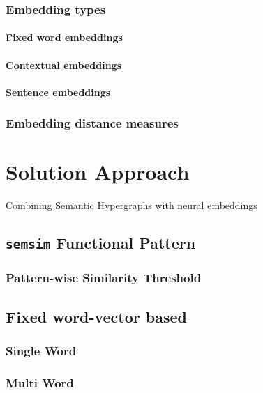 \documentclass[11pt]{scrreprt}
\begin{document}
\subsection{Embedding types}

\subsubsection{Fixed word embeddings}

\subsubsection{Contextual embeddings}

\subsubsection{Sentence embeddings}

\subsection{Embedding distance measures}




\chapter{Solution Approach}

Combining Semantic Hypergraphs with neural embeddings

\section{\texttt{semsim} Functional Pattern}

\subsection{Pattern-wise Similarity Threshold}


\section{Fixed word-vector based}

\subsection{Single Word}

\subsection{Multi Word}
\label{sec:semsim-multi-word}
\end{document}
